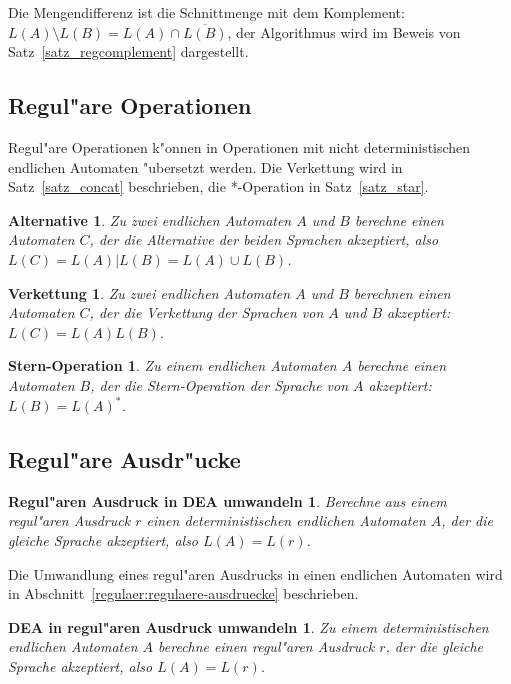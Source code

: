 Die Mengendifferenz ist die Schnittmenge mit dem Komplement:
$L(A)\setminus L(B)=L(A)\cap\overline{L(B)}$, der Algorithmus wird im Beweis
von Satz~\ref{satz_regcomplement} dargestellt.

\subsection{Regul"are Operationen}
Regul"are Operationen k"onnen in Operationen mit nicht deterministischen
endlichen Automaten "ubersetzt werden.
Die Verkettung wird in Satz~\ref{satz_concat} beschrieben, die *-Operation
in Satz~\ref{satz_star}.

\newtheorem*{Alternative}{Alternative}
\begin{Alternative}Zu zwei endlichen Automaten $A$ und $B$ berechne einen
Automaten $C$, der die Alternative der beiden Sprachen akzeptiert, also
$L(C)=L(A)|L(B)=L(A)\cup L(B)$.
\end{Alternative}

\newtheorem*{Verkettung}{Verkettung}
\begin{Verkettung}
Zu zwei endlichen Automaten $A$ und $B$ berechnen einen Automaten $C$,
der die Verkettung der Sprachen von $A$ und $B$ akzeptiert: $L(C)=L(A)L(B)$.
\end{Verkettung}

\newtheorem*{Sternoperation}{Stern-Operation}
\begin{Sternoperation}
Zu einem endlichen Automaten $A$ berechne einen Automaten $B$, der die
Stern-Operation der Sprache von $A$ akzeptiert: $L(B)=L(A)^*$.
\end{Sternoperation}



\subsection{Regul"are Ausdr"ucke}
\newtheorem*{RegexDea}{Regul"aren Ausdruck in DEA umwandeln}
\begin{RegexDea} Berechne aus einem regul"aren Ausdruck $r$ einen 
deterministischen endlichen Automaten $A$, der die gleiche Sprache
akzeptiert, also $L(A)=L(r)$.
\end{RegexDea}

Die Umwandlung eines regul"aren Ausdrucks in einen endlichen Automaten
wird in Abschnitt~\ref{regulaer:regulaere-ausdruecke} beschrieben.

\newtheorem*{DeaRegex}{DEA in regul"aren Ausdruck umwandeln}
\begin{DeaRegex}
Zu einem deterministischen endlichen Automaten $A$ berechne einen
regul"aren Ausdruck $r$, der die gleiche Sprache akzeptiert,
also $L(A)=L(r)$.
\end{DeaRegex}

